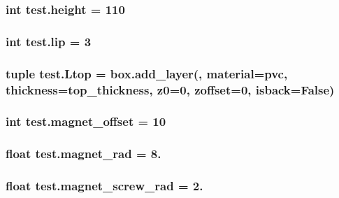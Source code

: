 \subsubsection[{height}]{\setlength{\rightskip}{0pt plus 5cm}int test.\+height = 110}\label{namespacetest_a0981d504d028598d82644c006c420453}
\hypertarget{namespacetest_a41fbb9ae9b5a863e7e882fc1ca2daa8a}{}
\subsubsection[{lip}]{\setlength{\rightskip}{0pt plus 5cm}int test.\+lip = 3}\label{namespacetest_a41fbb9ae9b5a863e7e882fc1ca2daa8a}
\hypertarget{namespacetest_aa7b8aa9411311181f994be4bcdb6d3c5}{}
\subsubsection[{Ltop}]{\setlength{\rightskip}{0pt plus 5cm}tuple test.\+Ltop = box.\+add\+\_\+layer(\textquotesingle{}, material=\textquotesingle{}pvc\textquotesingle{}, thickness={\bf top\+\_\+thickness}, z0=0, zoffset=0, isback=False)}\label{namespacetest_aa7b8aa9411311181f994be4bcdb6d3c5}
\hypertarget{namespacetest_a08f26fee2fec02db82eb7b6dc5c1aaa5}{}
\subsubsection[{magnet\+\_\+offset}]{\setlength{\rightskip}{0pt plus 5cm}int test.\+magnet\+\_\+offset = 10}\label{namespacetest_a08f26fee2fec02db82eb7b6dc5c1aaa5}
\hypertarget{namespacetest_ab757d0228bdd92d6efdc4b6f0ec34e81}{}
\subsubsection[{magnet\+\_\+rad}]{\setlength{\rightskip}{0pt plus 5cm}float test.\+magnet\+\_\+rad = 8.}\label{namespacetest_ab757d0228bdd92d6efdc4b6f0ec34e81}
\hypertarget{namespacetest_a9cf4c1f11ba8ff11dc2b8331dfa18f1f}{}
\subsubsection[{magnet\+\_\+screw\+\_\+rad}]{\setlength{\rightskip}{0pt plus 5cm}float test.\+magnet\+\_\+screw\+\_\+rad = 2.}\label{namespacetest_a9cf4c1f11ba8ff11dc2b8331dfa18f1f}
\hypertarget{namespacetest_a5e58b0c7b4760f790f0c6d5e162fda87}{}

